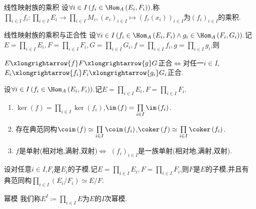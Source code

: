 \begin{definition}{线性映射族的乘积}{}
	设$\forall i\in I\left(f_{i}\in\Hom_{A}\left(E_{i},F_{i}\right)\right)$.称$\prod\limits_{i\in I}f_{i}:\prod\limits_{i\in I}E_{i}\to\prod\limits_{i\in I}M_{i},\left(x_{i}\right)_{i\in I}\mapsto \left(f_{i}\left(x_{i}\right)\right)_{i\in I}$为$\left(f_{i}\right)_{i\in I}$的乘积.
\end{definition}

\begin{proposition}{线性映射族的乘积与正合性}{}
	设$\forall i\in I\left(f_{i}\in\Hom_{A}\left(E_{i},F_{i}\right)\wedge g_{i}\in\Hom_{A}\left(F_{i},G_{i}\right)\right)$.记$E=\prod\limits_{i\in I}E_{i},F=\prod\limits_{i\in I}F_{i},G=\prod\limits_{i\in I}G_{i},f=\prod\limits_{i\in I}f_{i},g=\prod\limits_{i\in I}g_{i}$,则
	\begin{center}
		$E\xlongrightarrow{f}F\xlongrightarrow{g}G$正合$\iff$对任一$i\in I$,$E_{i}\xlongrightarrow{f_{i}}F_{i}\xlongrightarrow{g_{i}}G_{i}$正合.
	\end{center}
\end{proposition}

\begin{corollary}{}{}
	设$\forall i\in I\left(f_{i}\in\Hom_{A}\left(E_{i},F_{i}\right)\right)$.记$E=\prod\limits_{i\in I}E_{i},F=\prod\limits_{i\in I}F_{i}$.
	\begin{enumerate}
		\item $\ker\left(f\right)=\prod\limits_{i\in I}\ker\left(f_{i}\right)$,$\im\left(f\right)=\prod\limits_{i\in I}\im\left(f_{i}\right)$.
		\item 存在典范同构$\coim\left(f\right)\simeq\prod\limits_{i\in I}\coim\left(f_{i}\right)$,$\coker\left(f\right)\simeq\prod\limits_{i\in I}\coker\left(f_{i}\right)$.
		\item $f$是单射(相对地,满射,双射)$\iff$ $\left(f_{i}\right)_{i\in I}$是一族单射(相对地,满射,双射).
	\end{enumerate}
\end{corollary}

\begin{proposition}{}{}
	设对任意$i\in I$,$F_{i}$是$E_{i}$的子模.记$E=\prod\limits_{i\in I}E_{i},F=\prod\limits_{i\in I}F_{i}$,则$F$是$E$的子模,并且有典范同构$\prod\limits_{i\in I}\left(E_{i}/F_{i}\right)\simeq E/F$.
\end{proposition}

\begin{definition}{幂模}{}
	我们称$E^{I}\coloneq\prod\limits_{i\in I}E$为$E$的$I$次幂模.
\end{definition}

